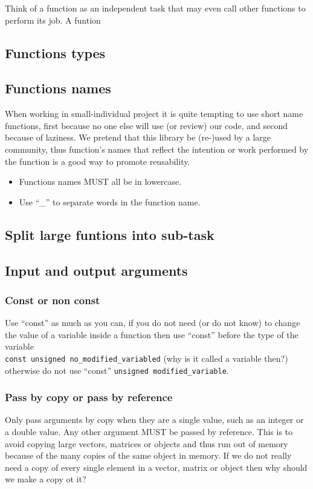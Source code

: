 \documentclass[12pt,a4paper,final]{report} %
\begin{document}
Think of a function as an independent task that may even call other
functions to perform its job. A funtion

\subsection{Functions types}

\subsection{Functions names}
When working in small-individual project it is quite tempting to use
short name functions, first because no one else will use (or review)
our code, and second because of laziness. We pretend that this library
be (re-)used by a large community, thus function's names that reflect
the intention or work performed by the function is a good way to
promote reusability.

\begin{itemize}
  \item Functions names MUST all be in lowercase.
  \item Use ``\_'' to separate words in the function name.
\end{itemize}

\subsection{Split large funtions into sub-task}

\subsection{Input and output arguments}

\subsubsection{Const or non const}
Use ``const'' as much as you can, if you do not need (or do not know)
to change the value of a variable inside a function then use ``const''
before the type of the variable\\

\texttt{const unsigned no\_modified\_variabled} (why is it called a
variable then?)
\\
otherwise do not use ``const'' \texttt{unsigned modified\_variable}.


\subsubsection{Pass by copy or pass by reference}
Only pass arguments by copy when they are a single value, such as an
integer or a double value. Any other argument MUST be passed by
reference. This is to avoid copying large vectors, matrices or objects
and thus run out of memory because of the many copies of the same
object in memory. If we do not really need a copy of every single
element in a vector, matrix or object then why should we make a copy
ot it?
\end{document}
